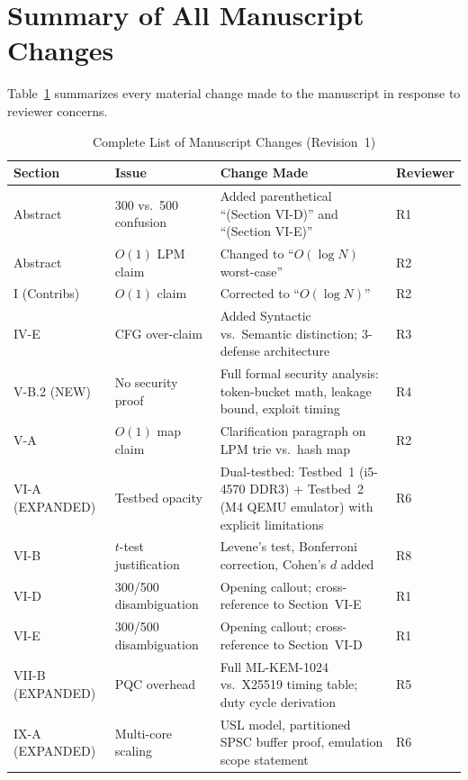 \documentclass[10pt,letterpaper]{article}
\begin{document}
\section{Summary of All Manuscript Changes}

Table~\ref{tab:changes} summarizes every material change made to the
manuscript in response to reviewer concerns.

\begin{table}[h]
\centering
\caption{Complete List of Manuscript Changes (Revision~1)}
\label{tab:changes}
\small
\begin{tabular}{p{1.5cm}p{3.5cm}p{5cm}p{3cm}}
\toprule
\textbf{Section} & \textbf{Issue} & \textbf{Change Made} & \textbf{Reviewer} \\
\midrule
Abstract         & 300 vs.\ 500 confusion & Added parenthetical ``(Section VI-D)'' and ``(Section VI-E)'' & R1 \\
Abstract         & $O(1)$ LPM claim       & Changed to ``$O(\log N)$ worst-case'' & R2 \\
I (Contribs)     & $O(1)$ claim           & Corrected to ``$O(\log N)$'' & R2 \\
IV-E             & CFG over-claim         & Added Syntactic vs.\ Semantic distinction; 3-defense architecture & R3 \\
V-B.2 (NEW)      & No security proof      & Full formal security analysis: token-bucket math, leakage bound, exploit timing & R4 \\
V-A              & $O(1)$ map claim       & Clarification paragraph on LPM trie vs.\ hash map & R2 \\
VI-A (EXPANDED)  & Testbed opacity        & Dual-testbed: Testbed~1 (i5-4570 DDR3) + Testbed~2 (M4 QEMU emulator) with explicit limitations & R6 \\
VI-B             & $t$-test justification & Levene's test, Bonferroni correction, Cohen's $d$ added & R8 \\
VI-D             & 300/500 disambiguation & Opening callout; cross-reference to Section~VI-E & R1 \\
VI-E             & 300/500 disambiguation & Opening callout; cross-reference to Section~VI-D & R1 \\
VII-B (EXPANDED) & PQC overhead           & Full ML-KEM-1024 vs.\ X25519 timing table; duty cycle derivation & R5 \\
IX-A (EXPANDED)  & Multi-core scaling     & USL model, partitioned SPSC buffer proof, emulation scope statement & R6 \\

\end{tabular}
\end{table}
\end{document}
